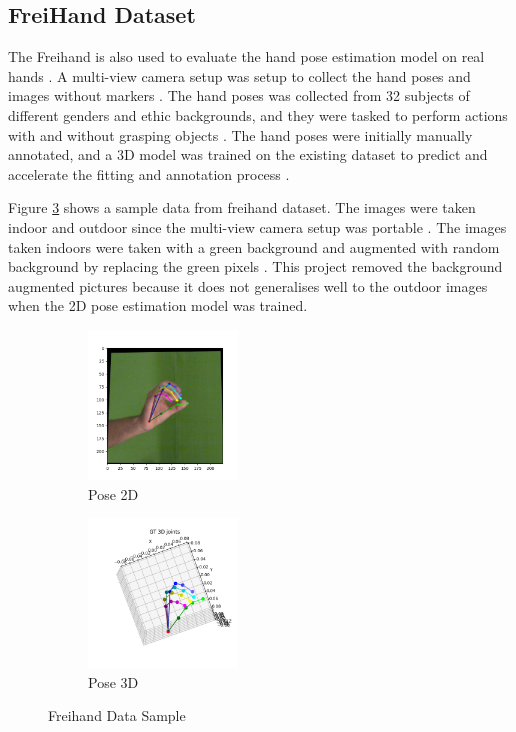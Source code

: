 \newpage
\subsection{FreiHand Dataset}
\noindent
The Freihand is also used to evaluate the hand pose estimation model on real hands \cite{freihand}. A multi-view camera setup was setup to collect the hand poses and images without markers \cite{freihand}. The hand poses was collected from 32 subjects of different genders and ethic backgrounds, and they were tasked to perform actions with and without grasping objects \cite{freihand}. The hand poses were initially manually annotated, and a 3D model was trained on the existing dataset to predict and accelerate the fitting and annotation process \cite{freihand}.

\noindent
Figure \ref{fig:freihand_sample_data} shows a sample data from freihand dataset. The images were taken indoor and outdoor since the multi-view camera setup was portable \cite{freihand}. The images taken indoors were taken with a green background and augmented with random background by replacing the green pixels \cite{freihand}. This project removed the background augmented pictures because it does not generalises well to the outdoor images when the 2D pose estimation model was trained.
\begin{figure}[ht]
    \begin{center}
        \begin{subfigure}[b]{0.35\textwidth}
            \includegraphics[width=150px]{assets/freihand_pose_2d.png}
            \caption{Pose 2D}
            \label{fig:freihand_pose_2d}
        \end{subfigure}
        \begin{subfigure}[b]{0.35\textwidth}
            \includegraphics[width=150px]{assets/freihand_pose_3d.png}
            \caption{Pose 3D}
            \label{fig:freihand_pose_3d}
        \end{subfigure}
	    \caption{Freihand Data Sample}
	    \label{fig:freihand_sample_data}        
    \end{center}
\end{figure}


